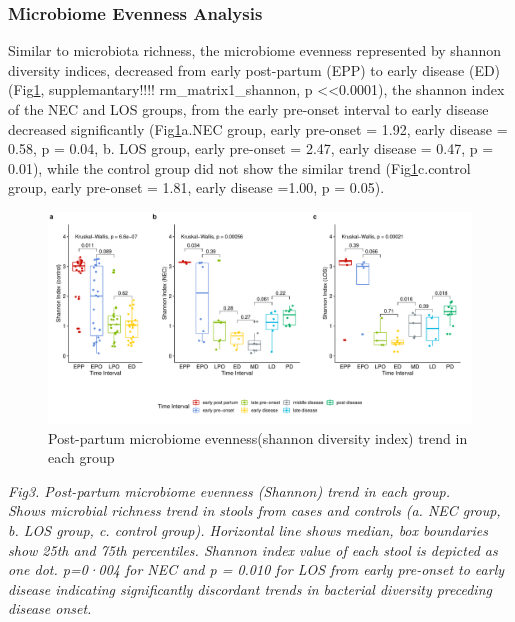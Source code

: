 \documentclass[fleqn,10pt]{wlpeerj} %
\begin{document}
    \subsubsection*{Microbiome Evenness Analysis}
    Similar to microbiota richness, the microbiome evenness represented by shannon diversity indices, decreased from early post-partum (EPP) to early disease (ED)(Fig\ref{fig:shannon-group-time}, supplemantary!!!! rm\_matrix1\_shannon, p \textless <0.0001), the shannon index of the NEC and LOS groups, from the early pre-onset interval to early disease decreased significantly (Fig\ref{fig:shannon-group-time}a.NEC group, early pre-onset = 1.92, early disease = 0.58, p = 0.04, b. LOS group, early pre-onset = 2.47, early disease = 0.47, p = 0.01), while the control group did not show the similar trend (Fig\ref{fig:shannon-group-time}c.control group, early pre-onset = 1.81, early disease =1.00, p = 0.05). \\
    \begin{figure}[ht]\centering
      \includegraphics[width=\linewidth]{figure/shannon-group-time2.pdf}
      \caption{Post-partum microbiome evenness(shannon diversity index) trend in each group}
      \label{fig:shannon-group-time}
    \end{figure}

    \textit{Fig3. Post-partum microbiome evenness (Shannon) trend in each group. \\ Shows microbial richness trend in stools from cases and controls (a. NEC group, b. LOS group, c. control group). Horizontal line shows median, box boundaries show 25th and 75th percentiles.  Shannon index value of each stool is depicted as one dot. p=0·004 for NEC and p = 0.010 for LOS from early pre-onset to early disease indicating significantly discordant trends in bacterial diversity preceding disease onset. }
\end{document}
